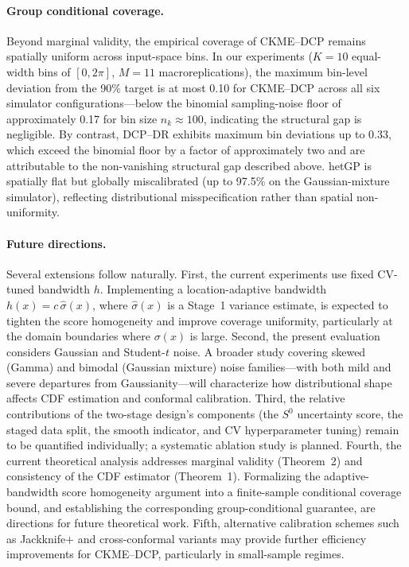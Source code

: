 \paragraph{Group conditional coverage.}
Beyond marginal validity, the empirical coverage of CKME--DCP remains
spatially uniform across input-space bins.
In our experiments ($K = 10$ equal-width bins of $[0, 2\pi]$,
$M = 11$ macroreplications), the maximum bin-level deviation from the
90\% target is at most 0.10 for CKME--DCP across all six simulator
configurations---below the binomial sampling-noise floor of
approximately 0.17 for bin size $n_k \approx 100$, indicating the
structural gap is negligible.
By contrast, DCP--DR exhibits maximum bin deviations up to 0.33,
which exceed the binomial floor by a factor of approximately two and
are attributable to the non-vanishing structural gap described above.
hetGP is spatially flat but globally miscalibrated
(up to 97.5\% on the Gaussian-mixture simulator), reflecting
distributional misspecification rather than spatial non-uniformity.

\paragraph{Future directions.}
Several extensions follow naturally.
%
First, the current experiments use fixed CV-tuned bandwidth $h$.
Implementing a location-adaptive bandwidth $h(x) = c\,\hat\sigma(x)$,
where $\hat\sigma(x)$ is a Stage~1 variance estimate, is expected to
tighten the score homogeneity and improve coverage uniformity,
particularly at the domain boundaries where $\sigma(x)$ is large.
%
Second, the present evaluation considers Gaussian and Student-$t$
noise. A broader study covering skewed (Gamma) and bimodal (Gaussian
mixture) noise families---with both mild and severe departures from
Gaussianity---will characterize how distributional shape affects CDF
estimation and conformal calibration.
%
Third, the relative contributions of the two-stage design's components
(the $S^0$ uncertainty score, the staged data split, the smooth
indicator, and CV hyperparameter tuning) remain to be quantified
individually; a systematic ablation study is planned.
%
Fourth, the current theoretical analysis addresses marginal validity
(Theorem~2) and consistency of the CDF estimator (Theorem~1).
Formalizing the adaptive-bandwidth score homogeneity argument into a
finite-sample conditional coverage bound, and establishing the
corresponding group-conditional guarantee, are directions for future
theoretical work.
%
Fifth, alternative calibration schemes such as Jackknife$+$ and
cross-conformal variants may provide further efficiency improvements
for CKME--DCP, particularly in small-sample regimes.


